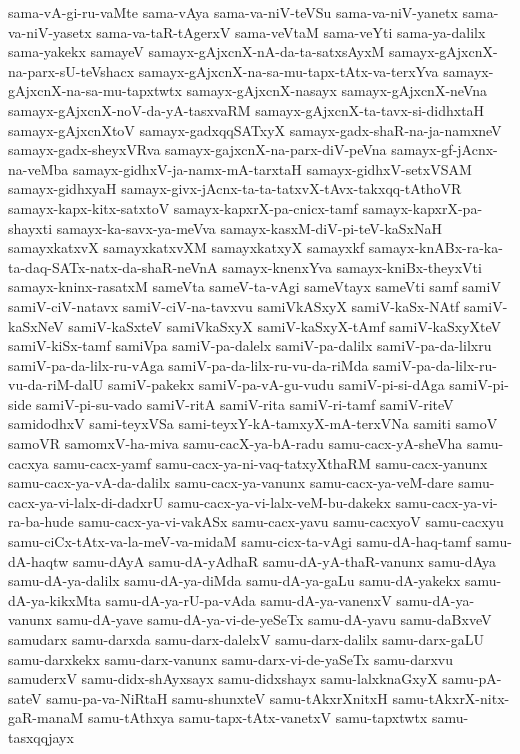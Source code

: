 {sama-vA-gi-ru-vaMte
sama-vAya
sama-va-niV-teVSu
sama-va-niV-yanetx
sama-va-niV-yasetx
sama-va-taR-tAgerxV
sama-veVtaM
sama-veYti
sama-ya-dalilx
sama-yakekx
samayeV
samayx-gAjxcnX-nA-da-ta-satxsAyxM
samayx-gAjxcnX-na-parx-sU-teVshacx
samayx-gAjxcnX-na-sa-mu-tapx-tAtx-va-terxYva
samayx-gAjxcnX-na-sa-mu-tapxtwtx
samayx-gAjxcnX-nasayx
samayx-gAjxcnX-neVna
samayx-gAjxcnX-noV-da-yA-tasxvaRM
samayx-gAjxcnX-ta-tavx-si-didhxtaH
samayx-gAjxcnXtoV
samayx-gadxqqSATxyX
samayx-gadx-shaR-na-ja-namxneV
samayx-gadx-sheyxVRva
samayx-gajxcnX-na-parx-diV-peVna
samayx-gf-jAcnx-na-veMba
samayx-gidhxV-ja-namx-mA-tarxtaH
samayx-gidhxV-setxVSAM
samayx-gidhxyaH
samayx-givx-jAcnx-ta-ta-tatxvX-tAvx-takxqq-tAthoVR
samayx-kapx-kitx-satxtoV
samayx-kapxrX-pa-cnicx-tamf
samayx-kapxrX-pa-shayxti
samayx-ka-savx-ya-meVva
samayx-kasxM-diV-pi-teV-kaSxNaH
samayxkatxvX
samayxkatxvXM
samayxkatxyX
samayxkf
samayx-knABx-ra-ka-ta-daq-SATx-natx-da-shaR-neVnA
samayx-knenxYva
samayx-kniBx-theyxVti
samayx-kninx-rasatxM
sameVta
sameV-ta-vAgi
sameVtayx
sameVti
samf
samiV
samiV-ciV-natavx
samiV-ciV-na-tavxvu
samiVkASxyX
samiV-kaSx-NAtf
samiV-kaSxNeV
samiV-kaSxteV
samiVkaSxyX
samiV-kaSxyX-tAmf
samiV-kaSxyXteV
samiV-kiSx-tamf
samiVpa
samiV-pa-dalelx
samiV-pa-dalilx
samiV-pa-da-lilxru
samiV-pa-da-lilx-ru-vAga
samiV-pa-da-lilx-ru-vu-da-riMda
samiV-pa-da-lilx-ru-vu-da-riM-dalU
samiV-pakekx
samiV-pa-vA-gu-vudu
samiV-pi-si-dAga
samiV-pi-side
samiV-pi-su-vado
samiV-ritA
samiV-rita
samiV-ri-tamf
samiV-riteV
samidodhxV
sami-teyxVSa
sami-teyxY-kA-tamxyX-mA-terxVNa
samiti
samoV
samoVR
samomxV-ha-miva
samu-cacX-ya-bA-radu
samu-cacx-yA-sheVha
samu-cacxya
samu-cacx-yamf
samu-cacx-ya-ni-vaq-tatxyXthaRM
samu-cacx-yanunx
samu-cacx-ya-vA-da-dalilx
samu-cacx-ya-vanunx
samu-cacx-ya-veM-dare
samu-cacx-ya-vi-lalx-di-dadxrU
samu-cacx-ya-vi-lalx-veM-bu-dakekx
samu-cacx-ya-vi-ra-ba-hude
samu-cacx-ya-vi-vakASx
samu-cacx-yavu
samu-cacxyoV
samu-cacxyu
samu-ciCx-tAtx-va-la-meV-va-midaM
samu-cicx-ta-vAgi
samu-dA-haq-tamf
samu-dA-haqtw
samu-dAyA
samu-dA-yAdhaR
samu-dA-yA-thaR-vanunx
samu-dAya
samu-dA-ya-dalilx
samu-dA-ya-diMda
samu-dA-ya-gaLu
samu-dA-yakekx
samu-dA-ya-kikxMta
samu-dA-ya-rU-pa-vAda
samu-dA-ya-vanenxV
samu-dA-ya-vanunx
samu-dA-yave
samu-dA-ya-vi-de-yeSeTx
samu-dA-yavu
samu-daBxveV
samudarx
samu-darxda
samu-darx-dalelxV
samu-darx-dalilx
samu-darx-gaLU
samu-darxkekx
samu-darx-vanunx
samu-darx-vi-de-yaSeTx
samu-darxvu
samuderxV
samu-didx-shAyxsayx
samu-didxshayx
samu-lalxknaGxyX
samu-pA-sateV
samu-pa-va-NiRtaH
samu-shunxteV
samu-tAkxrXnitxH
samu-tAkxrX-nitx-gaR-manaM
samu-tAthxya
samu-tapx-tAtx-vanetxV
samu-tapxtwtx
samu-tasxqqjayx
}
